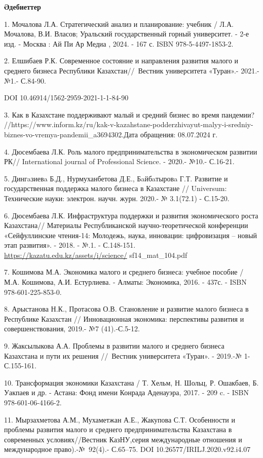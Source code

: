 {\bfseries Әдебиеттер}

1. Мочалова Л.А. Стратегический анализ и планирование: учебник / Л.А.
Мочалова, В.И. Власов; Уральский государственный горный университет. -
2-е изд. - Москва : Ай Пи Ар Медиа , 2024. - 167 с. ISBN
978-5-4497-1853-2.

2. Елшибаев Р.К. Современное состояние и направления развития малого и
среднего бизнеса Республики Казахстан//~Вестник университета «Туран».-
2021.-№1.- С.84-90.~

DOI 10.46914/1562-2959-2021-1-1-84-90

3. Как в Казахстане поддерживают малый и средний бизнес во время
пандемии?
//https://www.inform.kz/ru/kak-v-kazahstane-podderzhivayut-malyy-i-sredniy-biznes-vo-vremya-pandemii\_a3694302.Дата
обращения: 08.07.2024 г.

4. Дюсембаева Л.К. Роль малого предпринимательства в экономическом
развитии РК// International journal of Professional Science. - 2020.-
№10.- С.16-21.

5. Дингaзиевa Б.Д., Нурмуханбетова Д.Е., Бaйбaтыровa Г.Т. Развитие и
государственная поддержка малого бизнеса в Казахстане // Universum:
Технические науки: электрон. научн. журн. 2020.- № 3.1(72.1) - С.15-20.

6. Дюсембаева Л.К. Инфраструктура поддержки и развития экономического
роста Казахстана// Материалы Республиканской научно-теоретической
конференции «Сейфуллинские чтения-14: Молодежь, наука, инновации:
цифровизация -- новый этап развития». - 2018. - №.1. - С.148-151.
\url{https://kazatu.edu.kz/assets/i/science/} sf14\_mat\_104.pdf

7. Кошимова М.А. Экономика малого и среднего бизнеса: учебное пособие /
М.А. Кошимова, А.И. Естурлиева. - Алматы: Экономика, 2016. - 437с. -
ISBN 978-601-225-853-0.

8. Арыстанова Н.К., Протасова О.В. Становление и развитие малого бизнеса
в Республике Казахстан // Инновационная экономика: перспективы развития
и совершенствования, 2019.- №7 (41).-С.5-12.

9. Жаксылыкова А.А. Проблемы в развитии малого и среднего бизнеса
Казахстана и пути их решения //~Вестник университета «Туран». - 2019.-№
1-С.155-161.

10. Трансформация экономики Казахстана / Т. Хельм, Н. Шольц, Р.
Ошакбаев, Б. Уакпаев и др. - Астана: Фонд имени Конрада Аденауэра, 2017.
- 209 c. - ISBN 978-601-06-4166-2.

11. Мырзахметова А.М., Мухаметжан А.Е., Жакупова С.Т. Особенности и
проблемы развития малого и среднего предпринимательства Казахстана в
современных условиях//Вестник КазНУ,серия международные отношения и
международное право).-№~92(4).- С.65--75. DOI
10.26577/IRILJ.2020.v92.i4.07

